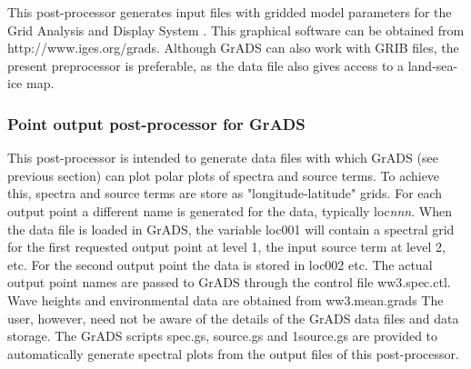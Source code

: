 
\vspace{\baselineskip} 
\noindent 
This post-processor generates input files with gridded model parameters for
the Grid Analysis and Display System \citep[GrADS,][]{man:GrADS}. This
graphical software can be obtained from http://www.iges.org/grads. Although
GrADS can also work with GRIB files, the present preprocessor is preferable,
as the data file also gives access to a land-sea-ice map.


\pb
\vsssub
\subsubsection{Point output post-processor for GrADS} \label{sec:post_gp}
\vsssub



\vspace{\baselineskip} 
\noindent
This post-processor is intended to generate data files with which GrADS (see
previous section) can plot polar plots of spectra and source terms. To achieve
this, spectra and source terms are store as "longitude-latitude" grids. For
each output point a different name is generated for the data, typically {\F
loc{\it nnn}}. When the data file is loaded in GrADS, the variable {\F loc001}
will contain a spectral grid for the first requested output point at level 1,
the input source term at level 2, etc. For the second output point the data is
stored in {\F loc002} etc. The actual output point names are passed to GrADS
through the control file {\file ww3.spec.ctl}. Wave heights and environmental
data are obtained from {\file ww3.mean.grads} The user, however, need not be
aware of the details of the GrADS data files and data storage. The GrADS
scripts {\file spec.gs}, {\file source.gs} and {\file 1source.gs} are provided
to automatically generate spectral plots from the output files of this
post-processor.

